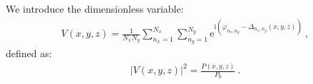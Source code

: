 \documentclass[a4paper,11pt,onecolumn]{scrartcl}
\renewcommand{\i}{\mathrm i}
\begin{document}
We introduce the dimensionless variable:
\begin{align}
\boxed{
V(x,y,z) = \frac{1}{N_xN_y}\sum_{n_x=1}^{N_x}\sum_{n_y=1}^{N_y} \mathrm e^{\i\left(\varphi_{n_x ,n_y} - \Delta_{n_x ,n_y}(x, y, z)\right)}
}\ ,
\end{align}
defined as: 
\begin{align}
\left|V(x,y,z)\right|^2 = \frac{P(x,y,z)}{P_0}\ .
\end{align}
\end{document}

